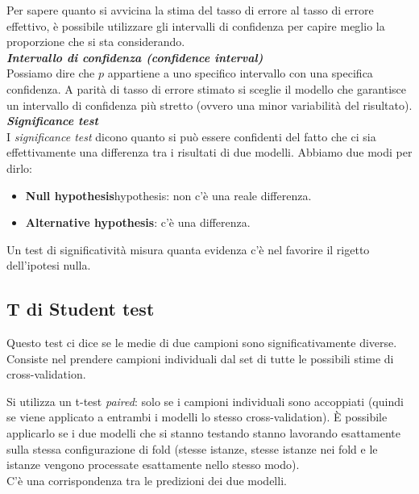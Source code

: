 
Per sapere quanto si avvicina la stima del tasso di errore al tasso di errore effettivo, è possibile utilizzare gli intervalli di confidenza per capire meglio la proporzione che si sta considerando.\\

\textbf{\textit{Intervallo di confidenza (confidence interval)}}\\
Possiamo dire che $p$ appartiene a uno specifico intervallo con una specifica confidenza. A parità di tasso di errore stimato si sceglie il modello che garantisce un intervallo di confidenza più stretto (ovvero una minor variabilità del risultato).\\

\textbf{\textit{Significance test}}\\
I \textit{significance test} dicono quanto si può essere confidenti del fatto che ci sia effettivamente una differenza tra i risultati di due modelli. Abbiamo due modi per dirlo:
\begin{itemize}
    \item \textbf{Null hypothesis}hypothesis: non c’è una reale differenza.
    \item \textbf{Alternative hypothesis}: c’è una differenza.
\end{itemize}
Un test di significatività misura quanta evidenza c’è nel favorire il rigetto dell’ipotesi nulla.

\subsection{T di Student test}
Questo test ci dice se le medie di due campioni sono significativamente diverse. Consiste nel prendere campioni individuali dal set di tutte le possibili stime di cross-validation.

Si utilizza un t-test \textit{paired}: solo se i campioni individuali sono accoppiati (quindi se viene applicato a entrambi i modelli lo stesso cross-validation). È possibile applicarlo se i due modelli che si stanno testando stanno lavorando esattamente sulla stessa configurazione di fold (stesse istanze, stesse istanze nei fold e le istanze vengono processate esattamente nello stesso modo).\\

C’è una corrispondenza tra le predizioni dei due modelli.

